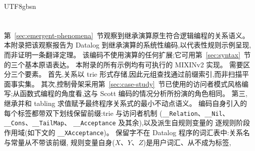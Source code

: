 \begin{CJK*}{UTF8}{gbsn}
\section{}
\label{app:datalog-encoding}

\ifPaperChinese
第~\ref{sec:emergent-phenomena}~节观察到继承演算原生符合逻辑编程的关系语义。
本附录把该观察报告为 Datalog 到继承演算的系统性编码,以代表性规则示例呈现,
而非证明一条翻译定理。
该编码不使用演算的任何扩展;它可用第~\ref{sec:syntax}~节的三个基本原语表达。
本附录的所有示例均有可执行的 MIXINv2 实现。
需要区分三个要素。
首先,关系以 trie 形式存储,因此元组查找通过前缀索引,而非扫描平面事实集。
其次,控制骨架采用第~\ref{sec:case-study}~节已使用的访问者模式风格编写;从函数式编程的角度看,这与 Scott 编码的情况分析所扮演的角色相同。
第三,继承并和 tabling 求值赋予最终程序关系式的最小不动点语义。
编码自身引入的每个标签都带双下划线保留前缀:trie 与访问者机制
(\texttt{__Relation}、\texttt{__Nil}、
\texttt{__Cons}、\texttt{__TailMap}、
\texttt{__Acceptance} 及其余),以及派生自规则变量的
逐规则阶段作用域(如下文的 \texttt{__XAcceptance})。
保留字不在 Datalog 程序的词汇表中:关系名与常量从不带该前缀,
规则变量自身($X$、$Y$、$Z$)是用户词汇、从不成为标签,

\end{CJK*}
